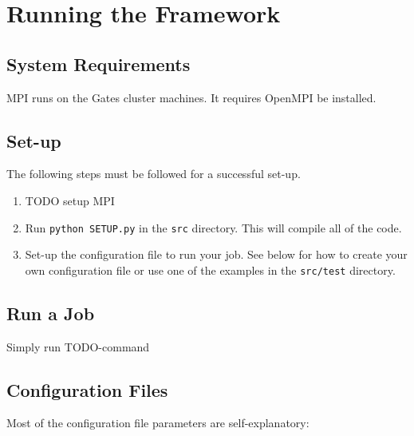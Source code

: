 \documentclass[12pt]{article}
\newcommand{\ttt}{\texttt}
\begin{document}
\maketitle

\pagebreak
\section{Running the Framework}

\subsection{System Requirements}

MPI runs on the Gates cluster machines. It requires OpenMPI be installed.

\subsection{Set-up}

The following steps must be followed for a successful set-up.

\begin{enumerate}
\item
TODO setup MPI

\item 
Run \ttt{python SETUP.py} in the \ttt{src} directory. This will compile all of the code.

\item
Set-up the configuration file to run your job. See below for how to create your own configuration file or use one of the examples in the \ttt{src/test} directory.
\end{enumerate}

\subsection{Run a Job}

Simply run TODO-command

\subsection{Configuration Files}

Most of the configuration file parameters are self-explanatory:
\end{document}
